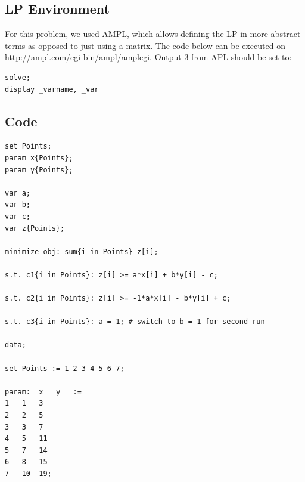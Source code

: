 \documentclass[12pt,letterpaper]{article}
\begin{document}
\subsection*{LP Environment}

For this problem, we used AMPL, which allows defining the LP in more abstract terms as opposed to just using a matrix. The code below can be executed on http://ampl.com/cgi-bin/ampl/amplcgi. Output 3 from APL should be set to:

\begin{verbatim}
solve;
display _varname, _var
\end{verbatim}

\subsection*{Code}

\begin{verbatim}
set Points;
param x{Points};
param y{Points};

var a;
var b;
var c;
var z{Points};

minimize obj: sum{i in Points} z[i];

s.t. c1{i in Points}: z[i] >= a*x[i] + b*y[i] - c;

s.t. c2{i in Points}: z[i] >= -1*a*x[i] - b*y[i] + c;

s.t. c3{i in Points}: a = 1; # switch to b = 1 for second run

data;

set Points := 1 2 3 4 5 6 7;

param:	x	y   :=
1	1	3
2	2	5
3	3	7
4	5	11
5	7	14
6	8	15
7	10	19;
\end{verbatim}
\end{document}
